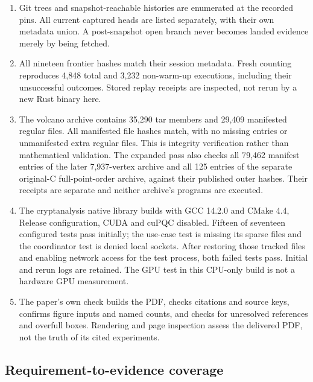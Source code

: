 \begin{enumerate}
\item Git trees and snapshot-reachable histories are enumerated at the
recorded pins. All current captured heads are listed separately, with
their own metadata union. A post-snapshot open branch never becomes
landed evidence merely by being fetched.
\item All nineteen frontier  hashes match their
session metadata. Fresh counting reproduces 4,848 total and 3,232
non-warm-up executions, including their unsuccessful outcomes. Stored
replay receipts are inspected, not rerun by a new Rust binary here.
\item The volcano archive contains 35,290 tar members and 29,409
manifested regular files. All manifested file hashes match, with no
missing entries or unmanifested extra regular files. This is integrity
verification rather than mathematical validation.
The expanded pass also checks all 79,462 manifest entries of the later
7,937-vertex archive and all 125 entries of the separate original-C
full-point-order archive, against their published outer hashes. Their
receipts are separate and neither archive's programs are executed.
\item The cryptanalysis native library builds with GCC 14.2.0 and CMake
4.4, Release configuration, CUDA and cuPQC disabled. Fifteen of seventeen
configured tests pass initially; the use-case test is missing its sparse
files and the coordinator test is denied local sockets. After restoring
those tracked files and enabling network access for the test process,
both failed tests pass. Initial and rerun logs are retained. The GPU
test in this CPU-only build is not a hardware GPU measurement.
\item The paper's own check builds the PDF, checks citations and source
keys, confirms figure inputs and named counts, and checks for unresolved
references and overfull boxes. Rendering and page inspection assess the
delivered PDF, not the truth of its cited experiments.
\end{enumerate}

\subsection{Requirement-to-evidence coverage}

